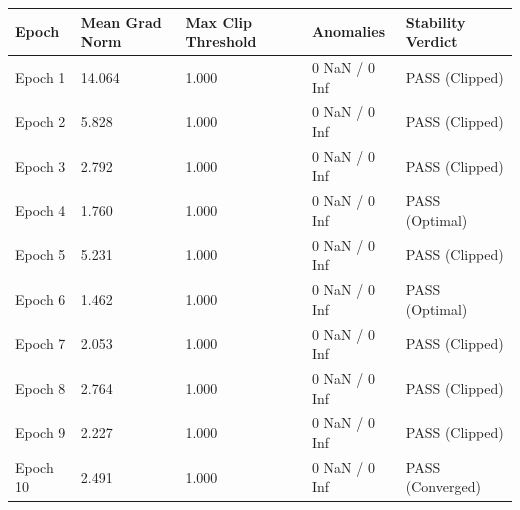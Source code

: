 \begin{tabular}{lllll}
\toprule
Epoch & Mean Grad Norm & Max Clip Threshold & Anomalies & Stability Verdict \\
\midrule
Epoch 1 & 14.064 & 1.000 & 0 NaN / 0 Inf & PASS (Clipped) \\
Epoch 2 & 5.828 & 1.000 & 0 NaN / 0 Inf & PASS (Clipped) \\
Epoch 3 & 2.792 & 1.000 & 0 NaN / 0 Inf & PASS (Clipped) \\
Epoch 4 & 1.760 & 1.000 & 0 NaN / 0 Inf & PASS (Optimal) \\
Epoch 5 & 5.231 & 1.000 & 0 NaN / 0 Inf & PASS (Clipped) \\
Epoch 6 & 1.462 & 1.000 & 0 NaN / 0 Inf & PASS (Optimal) \\
Epoch 7 & 2.053 & 1.000 & 0 NaN / 0 Inf & PASS (Clipped) \\
Epoch 8 & 2.764 & 1.000 & 0 NaN / 0 Inf & PASS (Clipped) \\
Epoch 9 & 2.227 & 1.000 & 0 NaN / 0 Inf & PASS (Clipped) \\
Epoch 10 & 2.491 & 1.000 & 0 NaN / 0 Inf & PASS (Converged) \\
\bottomrule
\end{tabular}
